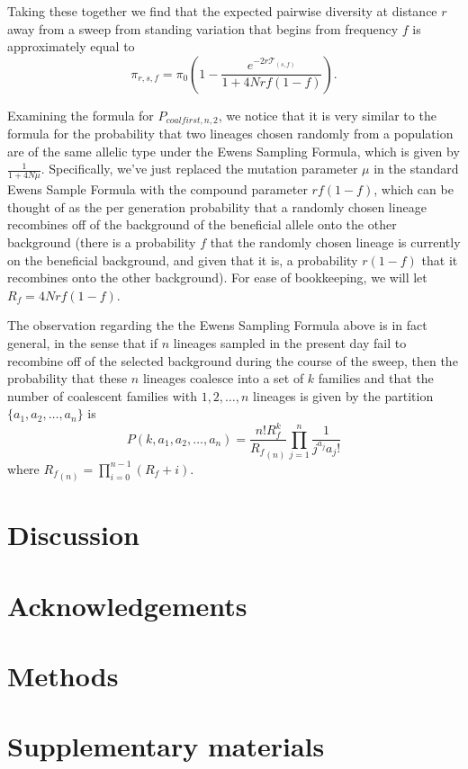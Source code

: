 \documentclass[a4paper,10pt]{article}
\begin{document}
Taking these together we find that the expected pairwise diversity at distance $r$ away from a sweep from standing variation that begins from frequency $f$ is approximately equal to
$$\pi_{r,s,f} = \pi_0\left(1 - \frac{e^{-2r\mathcal{T}_{\left(s,f\right)}}}{1 + 4Nrf\left(1-f\right)}\right).$$

Examining the formula for $P_{coalfirst,n,2}$, we notice that it is very similar to the formula for the probability that two lineages chosen randomly from a population are of the same allelic type under the Ewens Sampling Formula, which is given by $\frac{1}{1+4N\mu}$. Specifically, we've just replaced the mutation parameter $\mu$ in the standard Ewens Sample Formula with the compound parameter $rf\left(1-f\right)$, which can be thought of as the per generation probability that a randomly chosen lineage recombines off of the background of the beneficial allele onto the other background (there is a probability $f$ that the randomly chosen lineage is currently on the beneficial background, and given that it is, a probability $r\left(1-f\right)$ that it recombines onto the other background). For ease of bookkeeping, we will let $R_f = 4Nrf\left(1-f\right)$.

The observation regarding the the Ewens Sampling Formula above is in fact general, in the sense that if $n$ lineages sampled in the present day fail to recombine off of the selected background during the course of the sweep, then the  probability that these $n$ lineages coalesce into a set of $k$ families and that the number of coalescent families with $1,2,\dots,n$ lineages is given by the partition $\{a_1,a_2,\dots,a_n\}$ is 
$$P\left(k,a_1,a_2,\dots,a_n\right) = \frac{n!R_f^k}{{R_f}_{\left(n\right)}}\prod_{j=1}^n\frac{1}{j^{a_j}a_j!}$$
where ${R_f}_{\left(n\right)} = \prod_{i=0}^{n-1}\left(R_f+i\right)$.

\section{Discussion}


\section{Acknowledgements}

\section{Methods}





\section{Supplementary materials}

\setcounter{table}{0}
\renewcommand{\thetable}{S\arabic{table}}
\setcounter{figure}{0}
\renewcommand{\thefigure}{S\arabic{figure}}
\end{document}
